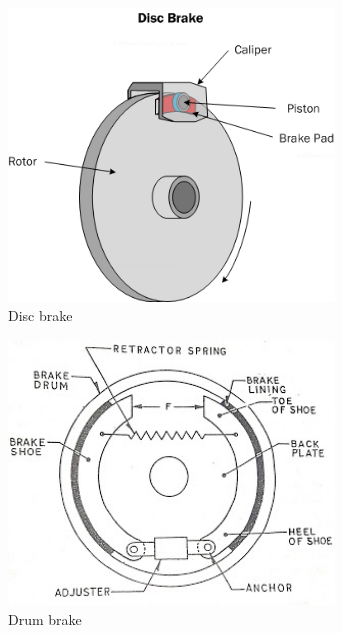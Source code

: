 \documentclass[10pt,letterpaper]{book}
\begin{document}
\begin{figure}[H]
	\begin{subfigure}[b]{.32\linewidth}
		\includegraphics[width=0.95\textwidth]{imgs/brake_disc.png}
		\caption{Disc brake}
	\end{subfigure}\begin{subfigure}[b]{.32\linewidth}
		\includegraphics[width=0.95\textwidth]{imgs/brake_drum.jpeg}
		\caption{Drum brake}
	\end{subfigure}\begin{subfigure}[b]{.32\linewidth}

\end{subfigure}
\end{figure}
\end{document}
